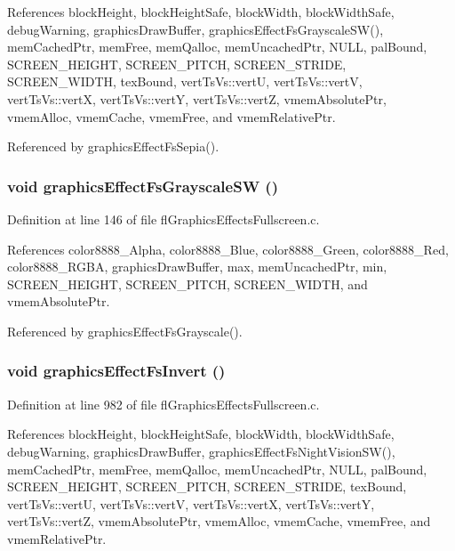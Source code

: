 References block\-Height, block\-Height\-Safe, block\-Width, block\-Width\-Safe, debug\-Warning, graphics\-Draw\-Buffer, graphics\-Effect\-Fs\-Grayscale\-SW(), mem\-Cached\-Ptr, mem\-Free, mem\-Qalloc, mem\-Uncached\-Ptr, NULL, pal\-Bound, SCREEN\_\-HEIGHT, SCREEN\_\-PITCH, SCREEN\_\-STRIDE, SCREEN\_\-WIDTH, tex\-Bound, vert\-Ts\-Vs::vert\-U, vert\-Ts\-Vs::vert\-V, vert\-Ts\-Vs::vert\-X, vert\-Ts\-Vs::vert\-Y, vert\-Ts\-Vs::vert\-Z, vmem\-Absolute\-Ptr, vmem\-Alloc, vmem\-Cache, vmem\-Free, and vmem\-Relative\-Ptr.

Referenced by graphics\-Effect\-Fs\-Sepia().
\subsubsection{\setlength{\rightskip}{0pt plus 5cm}void graphics\-Effect\-Fs\-Grayscale\-SW ()}\label{flGraphicsEffectsFullscreen_8h_d55dd118ed912361ac5992552e9386e9}




Definition at line 146 of file fl\-Graphics\-Effects\-Fullscreen.c.

References color8888\_\-Alpha, color8888\_\-Blue, color8888\_\-Green, color8888\_\-Red, color8888\_\-RGBA, graphics\-Draw\-Buffer, max, mem\-Uncached\-Ptr, min, SCREEN\_\-HEIGHT, SCREEN\_\-PITCH, SCREEN\_\-WIDTH, and vmem\-Absolute\-Ptr.

Referenced by graphics\-Effect\-Fs\-Grayscale().
\subsubsection{\setlength{\rightskip}{0pt plus 5cm}void graphics\-Effect\-Fs\-Invert ()}\label{flGraphicsEffectsFullscreen_8h_09a118987c4bc745af0adc15b73bdf51}




Definition at line 982 of file fl\-Graphics\-Effects\-Fullscreen.c.

References block\-Height, block\-Height\-Safe, block\-Width, block\-Width\-Safe, debug\-Warning, graphics\-Draw\-Buffer, graphics\-Effect\-Fs\-Night\-Vision\-SW(), mem\-Cached\-Ptr, mem\-Free, mem\-Qalloc, mem\-Uncached\-Ptr, NULL, pal\-Bound, SCREEN\_\-HEIGHT, SCREEN\_\-PITCH, SCREEN\_\-STRIDE, tex\-Bound, vert\-Ts\-Vs::vert\-U, vert\-Ts\-Vs::vert\-V, vert\-Ts\-Vs::vert\-X, vert\-Ts\-Vs::vert\-Y, vert\-Ts\-Vs::vert\-Z, vmem\-Absolute\-Ptr, vmem\-Alloc, vmem\-Cache, vmem\-Free, and vmem\-Relative\-Ptr.
